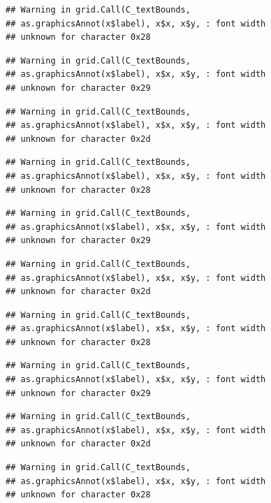 \documentclass[
]{book}
\begin{document}
\begin{verbatim}
## Warning in grid.Call(C_textBounds,
## as.graphicsAnnot(x$label), x$x, x$y, : font width
## unknown for character 0x28
\end{verbatim}

\begin{verbatim}
## Warning in grid.Call(C_textBounds,
## as.graphicsAnnot(x$label), x$x, x$y, : font width
## unknown for character 0x29
\end{verbatim}

\begin{verbatim}
## Warning in grid.Call(C_textBounds,
## as.graphicsAnnot(x$label), x$x, x$y, : font width
## unknown for character 0x2d
\end{verbatim}

\begin{verbatim}
## Warning in grid.Call(C_textBounds,
## as.graphicsAnnot(x$label), x$x, x$y, : font width
## unknown for character 0x28
\end{verbatim}

\begin{verbatim}
## Warning in grid.Call(C_textBounds,
## as.graphicsAnnot(x$label), x$x, x$y, : font width
## unknown for character 0x29
\end{verbatim}

\begin{verbatim}
## Warning in grid.Call(C_textBounds,
## as.graphicsAnnot(x$label), x$x, x$y, : font width
## unknown for character 0x2d
\end{verbatim}

\begin{verbatim}
## Warning in grid.Call(C_textBounds,
## as.graphicsAnnot(x$label), x$x, x$y, : font width
## unknown for character 0x28
\end{verbatim}

\begin{verbatim}
## Warning in grid.Call(C_textBounds,
## as.graphicsAnnot(x$label), x$x, x$y, : font width
## unknown for character 0x29
\end{verbatim}

\begin{verbatim}
## Warning in grid.Call(C_textBounds,
## as.graphicsAnnot(x$label), x$x, x$y, : font width
## unknown for character 0x2d
\end{verbatim}

\begin{verbatim}
## Warning in grid.Call(C_textBounds,
## as.graphicsAnnot(x$label), x$x, x$y, : font width
## unknown for character 0x28
\end{verbatim}
\end{document}
